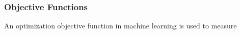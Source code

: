\subsubsection{Objective Functions}
An optimization objective function in machine learning is used to measure 